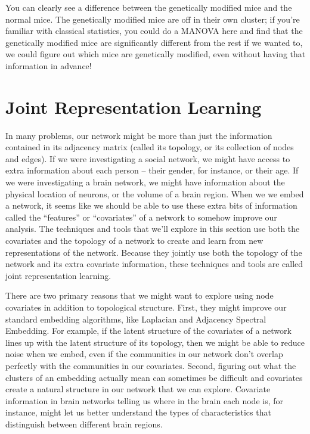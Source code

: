 \documentclass[letterpaper,10pt,english]{jupyterBook}
\begin{document}
\sphinxAtStartPar
You can clearly see a difference between the genetically modified mice and the normal mice. The genetically modified mice are off in their own cluster; if you’re familiar with classical statistics, you could do a MANOVA here and find that the genetically modified mice are significantly different from the rest \sphinxhyphen{} if we wanted to, we could figure out which mice are genetically modified, even without having that information in advance!


\section{Joint Representation Learning}
\label{\detokenize{representations/ch6/joint-representation-learning:joint-representation-learning}}\label{\detokenize{representations/ch6/joint-representation-learning::doc}}
\sphinxAtStartPar
In many problems, our network might be more than just the information contained in its adjacency matrix (called its topology, or its collection of nodes and edges). If we were investigating a social network, we might have access to extra information about each person – their gender, for instance, or their age. If we were investigating a brain network, we might have information about the physical location of neurons, or the volume of a brain region. When we we embed a network, it seems like we should be able to use these extra bits of information \sphinxhyphen{} called the “features” or “covariates” of a network \sphinxhyphen{} to somehow improve our analysis. The techniques and tools that we’ll explore in this section use both the covariates and the topology of a network to create and learn from new representations of the network. Because they jointly use both the topology of the network and its extra covariate information, these techniques and tools are called joint representation learning.

\sphinxAtStartPar
There are two primary reasons that we might want to explore using node covariates in addition to topological structure. First, they might improve our standard embedding algorithms, like Laplacian and Adjacency Spectral Embedding. For example, if the latent structure of the covariates of a network lines up with the latent structure of its topology, then we might be able to reduce noise when we embed, even if the communities in our network don’t overlap perfectly with the communities in our covariates. Second, figuring out what the clusters of an embedding actually mean can sometimes be difficult and covariates create a natural structure in our network that we can explore. Covariate information in brain networks telling us where in the brain each node is, for instance, might let us better understand the types of characteristics that distinguish between different brain regions.
\end{document}
